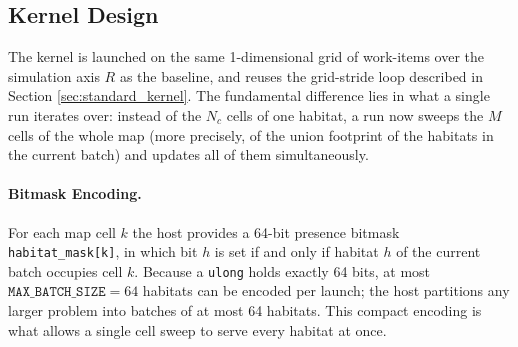 \subsection{Kernel Design}\label{subsec:map_centric_design}
The kernel is launched on the same 1-dimensional grid of work-items over the simulation axis $R$ as the baseline, and reuses the grid-stride loop described in Section \ref{sec:standard_kernel}. The fundamental difference lies in what a single run iterates over: instead of the $N_c$ cells of one habitat, a run now sweeps the $M$ cells of the whole map (more precisely, of the union footprint of the habitats in the current batch) and updates all of them simultaneously.

\paragraph{Bitmask Encoding.}
For each map cell $k$ the host provides a 64-bit presence bitmask \texttt{habitat\_mask[k]}, in which bit $h$ is set if and only if habitat $h$ of the current batch occupies cell $k$. Because a \texttt{ulong} holds exactly 64 bits, at most $\texttt{MAX\_BATCH\_SIZE} = 64$ habitats can be encoded per launch; the host partitions any larger problem into batches of at most 64 habitats. This compact encoding is what allows a single cell sweep to serve every habitat at once.

